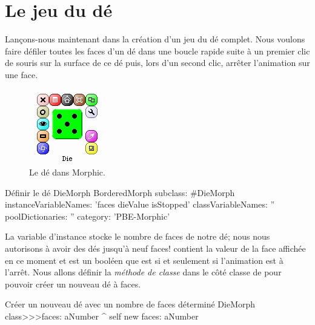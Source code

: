 \documentclass[a4paper,10pt,twoside]{book}
\begin{document}
\section{Le jeu du d\'e}

Lan\c{c}ons-nous maintenant dans la cr\'eation d'un jeu
du d\'e complet. Nous voulons faire d\'efiler toutes les faces d'un
d\'e dans une boucle rapide suite \`a un premier clic de
souris sur la surface de ce d\'e puis, lors
d'un second clic, arr\^eter l'animation sur une face.

\begin{figure}[ht]
	\centerline{\includegraphics[scale=0.65]{die}}
	\caption{Le d\'e dans Morphic.\label{fig:dialogDie}}
\end{figure}


\begin{classdef}{D\'efinir le d\'e DieMorph}
BorderedMorph subclass: #DieMorph
	instanceVariableNames: 'faces dieValue isStopped'
	classVariableNames: ''
	poolDictionaries: ''
	category: 'PBE-Morphic'
\end{classdef}

La variable d'instance  stocke le nombre de faces de notre
d\'e; nous nous autorisons \`a avoir des d\'es jusqu'\`a neuf faces!
 contient la valeur de la face affich\'ee en ce moment et
 est un bool\'een que est  si et seulement si
l'animation est \`a l'arr\^et.
Nous allons d\'efinir la \emph{m\'ethode de classe}  dans
le c\^ot\'e classe de  pour pouvoir cr\'eer un
nouveau d\'e \`a  faces.

\begin{method}{Cr\'eer un nouveau d\'e avec un nombre de faces d\'etermin\'e}
DieMorph class>>>faces: aNumber
	^ self new faces: aNumber
\end{method}
\end{document}

